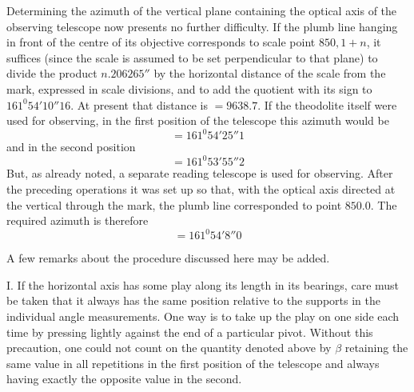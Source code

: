 Determining the azimuth of the vertical plane containing the optical axis of the observing telescope now presents no further difficulty. If the plumb line hanging in front of the centre of its objective corresponds to scale point $850{,}1+n$, it suffices (since the scale is assumed to be set perpendicular to that plane) to divide the product $n.206265''$ by the horizontal distance of the scale from the mark, expressed in scale divisions, and to add the quotient with its sign to $161^0 54'10''16$. At present that distance is $=9638.7$. If the theodolite itself were used for observing, in the first position of the telescope this azimuth would be
\[
=161^0 54'25''1
\]
and in the second position
\[
=161^0 53'55''2
\]
But, as already noted, a separate reading telescope is used for observing. After the preceding operations it was set up so that, with the optical axis directed at the vertical through the mark, the plumb line corresponded to point $850.0$. The required azimuth is therefore
\[
=161^0 54'8''0
\]

A few remarks about the procedure discussed here may be added.

I. If the horizontal axis has some play along its length in its bearings, care must be taken that it always has the same position relative to the supports in the individual angle measurements. One way is to take up the play on one side each time by pressing lightly against the end of a particular pivot. Without this precaution, one could not count on the quantity denoted above by $\beta$ retaining the same value in all repetitions in the first position of the telescope and always having exactly the opposite value in the second.

